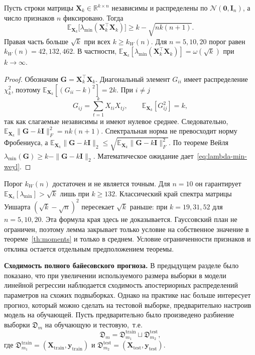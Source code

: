 \begin{lemma}
    \label{lem:lambda-min}
    Пусть строки матрицы $\mathbf{X}_k\in\mathbb{R}^{k\times n}$ независимы и распределены по $\mathcal{N}(\mathbf{0}, \mathbf{I}_n)$, а число признаков $n$ фиксировано. Тогда
    \begin{equation}
        \label{eq:lambda-min-weyl}
        \mathbb{E}_{\mathbf{X}_k}\bigl[\lambda_{\min}(\mathbf{X}_k^\top\mathbf{X}_k)\bigr]
        \geqslant
        k-\sqrt{nk(n+1)}.
    \end{equation}
    Правая часть больше $\sqrt{k}$ при всех $k\geqslant k_W(n)$. Для $n=5, 10, 20$ порог равен $k_W(n)=42, 132, 462$. В частности, $\mathbb{E}_{\mathbf{X}_k}[\lambda_{\min}(\mathbf{X}_k^\top\mathbf{X}_k)]=\omega(\sqrt{k})$ при $k\to\infty$.
\end{lemma}

\begin{proof}
    Обозначим $\mathbf{G}=\mathbf{X}_k^\top\mathbf{X}_k$. Диагональный элемент $G_{ii}$ имеет распределение $\chi^2_k$, поэтому $\mathbb{E}_{\mathbf{X}_k}[(G_{ii}-k)^2]=2k$. При $i\neq j$
    \[
        G_{ij}=\sum_{t=1}^{k} X_{ti}X_{tj},
        \qquad
        \mathbb{E}_{\mathbf{X}_k}[G_{ij}^2]=k,
    \]
    так как слагаемые независимы и имеют нулевое среднее. Следовательно, $\mathbb{E}_{\mathbf{X}_k}\|\mathbf{G}-k\mathbf{I}\|_F^2=nk(n+1)$. Спектральная норма не превосходит норму Фробениуса, а $\mathbb{E}_{\mathbf{X}_k}\|\mathbf{G}-k\mathbf{I}\|_2\leqslant\sqrt{\mathbb{E}_{\mathbf{X}_k}\|\mathbf{G}-k\mathbf{I}\|_F^2}$. По теореме Вейля $\lambda_{\min}(\mathbf{G})\geqslant k-\|\mathbf{G}-k\mathbf{I}\|_2$. Математическое ожидание дает~\eqref{eq:lambda-min-weyl}.
\end{proof}

Порог $k_W(n)$ достаточен и не является точным. Для $n=10$ он гарантирует $\mathbb{E}_{\mathbf{X}_k}[\lambda_{\min}]>\sqrt{k}$ лишь при $k\geqslant 132$. Классический край спектра матрицы Уишарта $(\sqrt{k}-\sqrt{n})^2$ пересекает $\sqrt{k}$ раньше: при $k=19, 31, 52$ для $n=5, 10, 20$. Эта формула края здесь не доказывается. Гауссовский план не ограничен, поэтому лемма закрывает только условие на собственное значение в теореме~\ref{th:moments} и только в среднем. Условие ограниченности признаков и отклика остается отдельным предположением теоремы.

\textbf{Сходимость полного байесовского прогноза.} В предыдущем разделе было показано, что при увеличении используемого размера выборки в модели линейной регрессии наблюдается сходимость апостериорных распределений параметров на схожих подвыборках. Однако на практике нас больше интересует прогноз, который можно сделать на тестовой выборке, предварительно настроив модель на обучающей. Пусть предварительно было произведено разбиение выборки $\mathfrak{D}_m$ на обучающую и тестовую,~т.\:е.
\begin{equation}
    \mathfrak{D}_m = \mathfrak{D}_{m_1}^{\text{train}} \sqcup \mathfrak{D}_{m_2}^{\text{test}},
\end{equation}
где $\mathfrak{D}_{m_1}^{\text{train}} = (\mathbf{X}_{\text{train}}, \mathbf{y}_{\text{train}})$ и $\mathfrak{D}_{m_2}^{\text{test}} = (\mathbf{X}_{\text{test}}, \mathbf{y}_{\text{test}})$.

